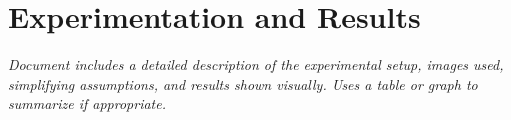 \section{Experimentation and Results}
\textit{Document includes a detailed description of the experimental setup, images used, simplifying assumptions, and results shown visually. Uses a table or graph to summarize if appropriate.}